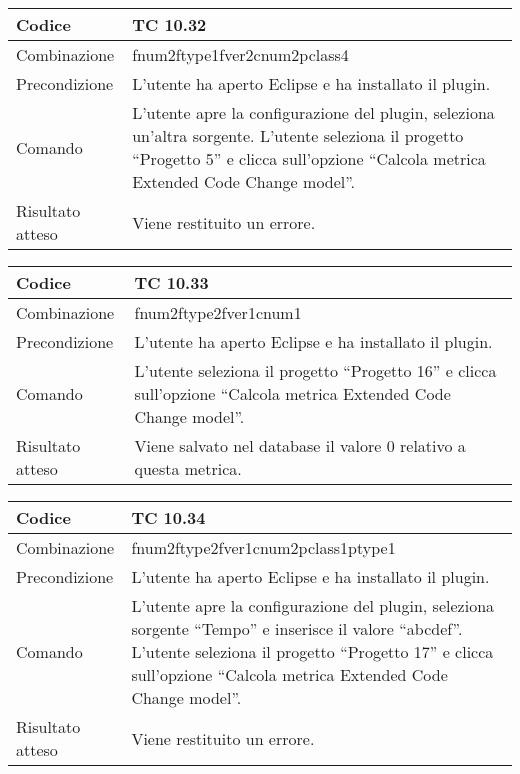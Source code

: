 \begin{table}[ht]
\begin{tabular}{|p{3cm}|p{9cm}|}
\hline
\cellcolor{lightgray}Codice				& TC 10.32								\\
\hline
\cellcolor{lightgray}Combinazione		& fnum2ftype1fver2cnum2pclass4									\\
\hline
\cellcolor{lightgray}Precondizione		& L'utente ha aperto Eclipse e ha installato il plugin.		\\
\hline
\cellcolor{lightgray}Comando			& L'utente apre la configurazione del plugin, seleziona un'altra sorgente. L'utente seleziona il progetto ``Progetto 5''  e clicca sull'opzione ``Calcola metrica Extended Code Change model''.	\\
\hline
\cellcolor{lightgray}Risultato atteso	& Viene restituito un errore.\\
\hline
\end{tabular}
\end{table}

\begin{table}[ht]
\begin{tabular}{|p{3cm}|p{9cm}|}
\hline
\cellcolor{lightgray}Codice				& TC 10.33								\\
\hline
\cellcolor{lightgray}Combinazione		& fnum2ftype2fver1cnum1									\\
\hline
\cellcolor{lightgray}Precondizione		& L'utente ha aperto Eclipse e ha installato il plugin.		\\
\hline
\cellcolor{lightgray}Comando			& L'utente seleziona il progetto ``Progetto 16''  e clicca sull'opzione ``Calcola metrica Extended Code Change model''.	\\
\hline
\cellcolor{lightgray}Risultato atteso	& Viene salvato nel database il valore 0 relativo a questa metrica.\\
\hline
\end{tabular}
\end{table}

\clearpage

\begin{table}[ht]
\begin{tabular}{|p{3cm}|p{9cm}|}
\hline
\cellcolor{lightgray}Codice				& TC 10.34								\\
\hline
\cellcolor{lightgray}Combinazione		& fnum2ftype2fver1cnum2pclass1ptype1									\\
\hline
\cellcolor{lightgray}Precondizione		& L'utente ha aperto Eclipse e ha installato il plugin.		\\
\hline
\cellcolor{lightgray}Comando			& L'utente apre la configurazione del plugin, seleziona sorgente ``Tempo'' e inserisce il valore ``abcdef''. L'utente seleziona il progetto ``Progetto 17''  e clicca sull'opzione ``Calcola metrica Extended Code Change model''.	\\
\hline
\cellcolor{lightgray}Risultato atteso	& Viene restituito un errore.\\
\hline
\end{tabular}
\end{table}

